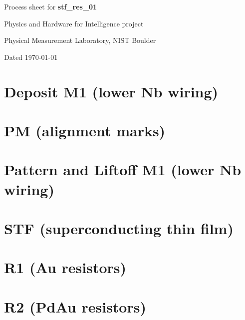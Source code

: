 \documentclass[]{article}
\begin{document}
\centerline{\LARGE Process sheet for \textbf{stf\_res\_01}}
\vspace{0.5em}
\centerline{\Large Physics and Hardware for Intelligence project}
\vspace{0.5em}
\centerline{\large Physical Measurement Laboratory, NIST Boulder}
\vspace{0.5em}
\centerline{Dated \today}

\begin{figure}[!h]
\centering
\setlength{\fboxsep}{0pt}%
\setlength{\fboxrule}{0pt}%
\end{figure}

\begin{abstract}

\vspace{1em}
\end{abstract}

\begin{multicols}{2}
\setcounter{tocdepth}{2}
\setcounter{secnumdepth}{4}
\tableofcontents
\end{multicols}
\newpage

\section{\label{sec:m1_dep}Deposit M1 (lower Nb wiring)}


\newpage
\section{\label{sec:pm}PM (alignment marks)}


\newpage
\section{\label{sec:m1}Pattern and Liftoff M1 (lower Nb wiring)}


\newpage
\section{\label{sec:stf}STF (superconducting thin film)}


\newpage
\section{\label{sec:r1}R1 (Au resistors)}


\newpage
\section{\label{sec:r2}R2 (PdAu resistors)}

\end{document}
